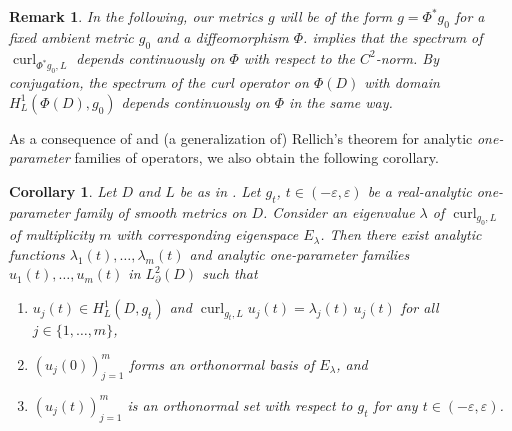 \documentclass[11pt,reqno]{amsart}
\newtheorem{remark}{Remark}[section]
\newtheorem{corollary}{Corollary}[section]
\DeclareMathOperator{\curl}{curl}
\begin{document}
\begin{remark}\label{remark: continuity of spectrum}
    In the following, our metrics $g$ will be of the form $g = \Phi^\ast g_0$ for a fixed ambient metric $g_0$ and a diffeomorphism $\Phi$.  implies that the spectrum of $\curl_{\Phi^\ast g_0,L}$ depends continuously on $\Phi$ with respect to the $C^2$-norm. By conjugation, the spectrum of the curl operator on $\Phi(D)$ with domain $H^1_L(\Phi(D),g_0)$ depends continuously on $\Phi$ in the same way.
\end{remark}

As a consequence of  and (a generalization of) Rellich's theorem for analytic \emph{one-parameter} families of operators, we also obtain the following corollary. %

\begin{corollary}
    \label{cor:Rellich}
    Let $D$ and $L$ be as in . Let $g_t$, $t \in (-\varepsilon,\varepsilon)$ be a real-analytic one-parameter family of smooth metrics on $D$. Consider an eigenvalue $\lambda$ of $\curl_{g_0,L}$ of multiplicity $m$ with corresponding eigenspace $E_\lambda$. Then there exist analytic functions $\lambda_1(t), \ldots, \lambda_m(t)$ and analytic one-parameter families $u_1(t), \ldots, u_m(t)$ in $L^2_\partial(D)$ such that
    \begin{enumerate}
        \item $u_j(t) \in H^1_L(D,g_t)$ and $\curl_{g_t,L} u_j(t) = \lambda_j(t)\, u_j(t)$ for all $j \in \{1,\ldots,m\}$,
        \item $(u_j(0))_{j=1}^m$ forms an orthonormal basis of $E_\lambda$, and
        \item $(u_j(t))_{j=1}^m$ is an orthonormal set with respect to $g_t$ for any $t \in (-\varepsilon,\varepsilon)$.
    \end{enumerate}
\end{corollary}
\end{document}
